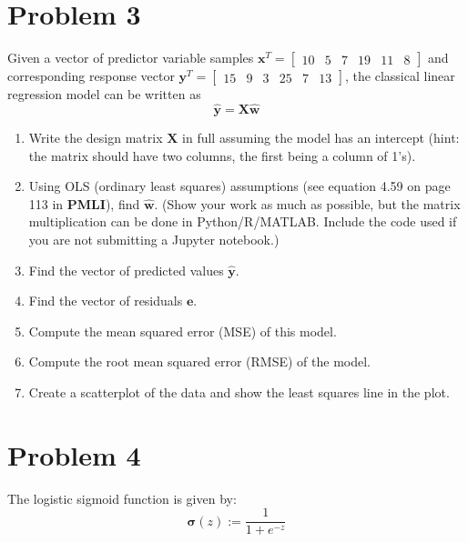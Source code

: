 \documentclass[11pt,twoside]{article}
\newcommand{\pts}[1]{\marginpar{ \small\hspace{0pt} \textit{[#1]} } }
\newcommand{\?}{\stackrel{?}{=}}
\newcommand{\fr}{\frac}
\begin{document}
\section*{Problem 3}
 
Given a vector of predictor variable samples $\bm{x}^{T} = \begin{bmatrix} 10 & 5 & 7 & 19 & 11 & 8\end{bmatrix}$
and corresponding response vector $\bm{y}^{T} = \begin{bmatrix}15 & 9 & 3 & 25 & 7 & 13 \end{bmatrix}$, the classical linear regression model can be written as
\begin{equation*}
  \hat{\bm y} = \bm X \hat{\bm w} 
\end{equation*}


\begin{enumerate}[\bf (a)]
 
\item Write the design matrix $\bm X$ in full assuming the model has an intercept (hint: the matrix should have two columns, the first being a column of 1's).  \pts{2} 

\item Using OLS (ordinary least squares) assumptions (see equation 4.59 on page 113 in \textbf{PMLI}), \pts{4} find $\bm{\hat w}$. (Show your work as much as possible, but the matrix multiplication can be done in Python/R/MATLAB. Include the code used if you are not submitting a Jupyter notebook.) 

\item Find the vector of predicted values  $\bm{\hat y}$. \pts{2}  
 
\item Find the vector of residuals $\bm e$. \pts{2}

\item Compute the mean squared error (MSE) of this model. \pts{2}

\item Compute the root mean squared error (RMSE) of the model. \pts{1}

\item Create a scatterplot of the data and show the least squares line \pts{3} in the plot.
  
\end{enumerate}


\section*{Problem 4 }
The logistic sigmoid function is given by:
\begin{equation}
  \bm\sigma(z) := \fr{1}{1 + e^{-z}}
\end{equation}
\end{document}
